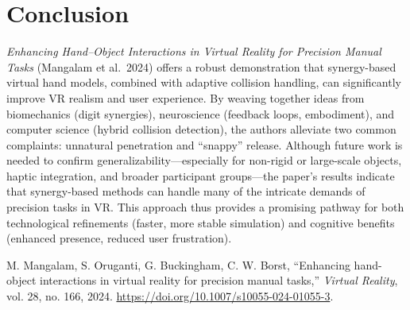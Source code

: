\documentclass{llncs}
\begin{document}
\section*{Conclusion}
\emph{Enhancing Hand--Object Interactions in Virtual Reality for Precision Manual Tasks} (Mangalam et al.\ 2024) offers a robust demonstration that synergy-based virtual hand models, combined with adaptive collision handling, can significantly improve VR realism and user experience. By weaving together ideas from biomechanics (digit synergies), neuroscience (feedback loops, embodiment), and computer science (hybrid collision detection), the authors alleviate two common complaints: unnatural penetration and ``snappy'' release. Although future work is needed to confirm generalizability---especially for non-rigid or large-scale objects, haptic integration, and broader participant groups---the paper’s results indicate that synergy-based methods can handle many of the intricate demands of precision tasks in VR. This approach thus provides a promising pathway for both technological refinements (faster, more stable simulation) and cognitive benefits (enhanced presence, reduced user frustration).

\vspace{1em}
\noindent

\begin{thebibliography}{1}

M. Mangalam, S. Oruganti, G. Buckingham, C. W. Borst,
``Enhancing hand-object interactions in virtual reality for precision manual tasks,''
\textit{Virtual Reality},
vol. 28, no. 166, 2024.
\url{https://doi.org/10.1007/s10055-024-01055-3}.

\end{thebibliography}
\end{document}
